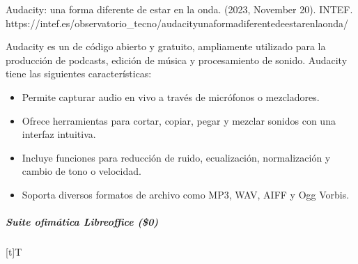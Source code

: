 \documentclass[letterpaper,10pt,spanish]{sphinxmanual}
\let\sphinxpxdimen\pdfpxdimen\else\newdimen\sphinxpxdimen
\begin{document}
\sphinxAtStartPar
%
\begin{footnote}[9]\sphinxAtStartFootnote
Audacity: una forma diferente de estar en la onda. (2023, November 20). INTEF. https://intef.es/observatorio\_tecno/audacity\sphinxhyphen{}una\sphinxhyphen{}forma\sphinxhyphen{}diferente\sphinxhyphen{}de\sphinxhyphen{}estar\sphinxhyphen{}en\sphinxhyphen{}la\sphinxhyphen{}onda/
%
\end{footnote} Audacity es un  de código abierto y gratuito, ampliamente utilizado para la producción de podcasts, edición de música y procesamiento de sonido. Audacity tiene las siguientes características:
\begin{itemize}
\item {} 
\sphinxAtStartPar
{} Permite capturar audio en vivo a través de micrófonos o mezcladores.

\item {} 
\sphinxAtStartPar
{} Ofrece herramientas para cortar, copiar, pegar y mezclar sonidos con una interfaz intuitiva.

\item {} 
\sphinxAtStartPar
{} Incluye funciones para reducción de ruido, ecualización, normalización y cambio de tono o velocidad.

\item {} 
\sphinxAtStartPar
{} Soporta diversos formatos de archivo como MP3, WAV, AIFF y Ogg Vorbis.

\end{itemize}


\subparagraph{Suite ofimática Libreoffice (\$0)}
\label{\detokenize{cursos/ofimatica10/recursos/T02:suite-ofimatica-libreoffice-0}}

\begin{savenotes}\sphinxattablestart
\sphinxthistablewithglobalstyle
\centering
\begin{tabulary}{\linewidth}[t]{T}
\sphinxtoprule
\sphinxtableatstartofbodyhook

\begin{sphinxfigure-in-table}
\centering
\capstart
\noindent\sphinxincludegraphics[width=360\sphinxpxdimen]{{image101}.png}
\label{\detokenize{cursos/ofimatica10/recursos/T02:id42}}\end{sphinxfigure-in-table}\relax
\\
\sphinxbottomrule
\end{tabulary}
\sphinxtableafterendhook\par
\sphinxattableend\end{savenotes}
\end{document}
